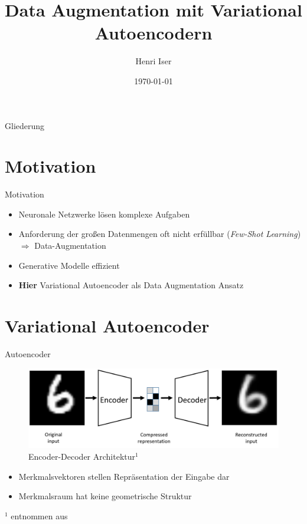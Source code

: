 \documentclass[10pt, compress]{beamer}
\title{Data Augmentation mit Variational Autoencodern}
\date{\today}
\author{Henri Iser}
\institute{Rheinische Friedrich-Wilhelms-Universität Bonn}
\begin{document}
\maketitle

\begin{frame}{Gliederung}
  \tableofcontents
\end{frame}


\section{Motivation}
\begin{frame}{Motivation}
  \begin{itemize}
    \item Neuronale Netzwerke lösen komplexe Aufgaben
    \item Anforderung der großen Datenmengen oft nicht erfüllbar (\textit{Few-Shot Learning})\\
    $\Rightarrow$ Data-Augmentation
    \item Generative Modelle effizient
    \item \textbf{Hier} Variational Autoencoder als Data Augmentation Ansatz
  \end{itemize}
\end{frame}


\section{Variational Autoencoder}
\begin{frame}{Autoencoder}
  \begin{figure}[hbt]
    \includegraphics[width=.5\textwidth]{gfx/literature/autoencoder}
    \caption{Encoder-Decoder Architektur$^1$}
  \end{figure}
  \begin{itemize}
    \item Merkmalsvektoren stellen Repräsentation der Eingabe dar
    \item Merkmalsraum hat keine geometrische Struktur
  \end{itemize}
  \vfill
  {\tiny $^1$ entnommen aus \cite{LopezPinaya2019}}
\end{frame}
\end{document}
